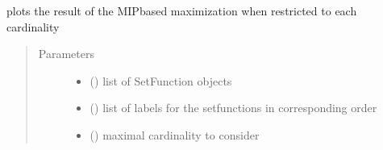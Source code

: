 \documentclass[letterpaper,10pt,english]{sphinxmanual}
\begin{document}
\begin{fulllineitems}
\label{\detokenize{setFTs:setFTs.plotting.plot_max_mip}}
\sphinxAtStartPar
plots the result of the MIP\sphinxhyphen{}based maximization when restricted to each cardinality
\begin{quote}\begin{description}
\item[{Parameters}] \leavevmode\begin{itemize}
\item {} 
\sphinxAtStartPar
{} (\sphinxstyleliteralemphasis{\sphinxupquote{{[}}}\sphinxstyleliteralemphasis{\sphinxupquote{{]}}}) \textendash{} list of SetFunction objects

\item {} 
\sphinxAtStartPar
{} (\sphinxstyleliteralemphasis{\sphinxupquote{{[}}}\sphinxstyleliteralemphasis{\sphinxupquote{{]}}}) \textendash{} list of labels for the setfunctions in corresponding order

\item {} 
\sphinxAtStartPar
{} () \textendash{} maximal cardinality to consider

\end{itemize}

\end{description}\end{quote}

\end{fulllineitems}

\end{document}
